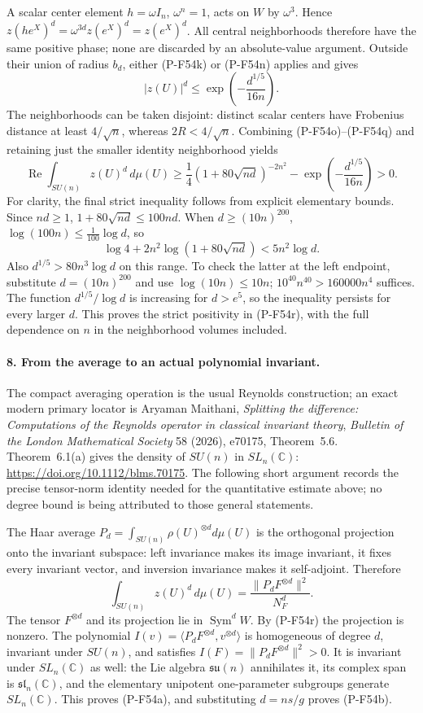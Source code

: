 A scalar center element $h=\omega I_n$, $\omega^n=1$,
acts on $W$ by $\omega^3$. Hence
$z(he^X)^d=\omega^{3d}z(e^X)^d=z(e^X)^d$.
All central neighborhoods therefore have the same positive
phase; none are discarded by an absolute-value argument.
Outside their union of radius $b_d$, either (P-F54k) or
(P-F54n) applies and gives
\[
       |z(U)|^d\le
           \exp\left(-\frac{d^{1/5}}{16n}\right).             \tag{P-F54q}
\]
The neighborhoods can be taken disjoint: distinct scalar
centers have Frobenius distance at least $4/\sqrt n$,
whereas $2R<4/\sqrt n$. Combining (P-F54o)--(P-F54q)
and retaining just the smaller identity neighborhood yields
\[
 \operatorname{Re}\int_{SU(n)}z(U)^d\,d\mu(U)
 \ge\frac14(1+80\sqrt{nd})^{-2n^2}
        -\exp\left(-\frac{d^{1/5}}{16n}\right)>0.             \tag{P-F54r}
\]
For clarity, the final strict inequality follows from explicit
elementary bounds. Since $nd\ge1$,
$1+80\sqrt{nd}\le100nd$.
When $d\ge(10n)^{200}$,
$\log(100n)\le\frac1{100}\log d$, so
\[
 \log4+2n^2\log(1+80\sqrt{nd})<5n^2\log d.
\]
Also $d^{1/5}>80n^3\log d$ on this range.
To check the latter at the left endpoint, substitute
$d=(10n)^{200}$ and use $\log(10n)\le10n$;
$10^{40}n^{40}>160000n^4$ suffices.
The function $d^{1/5}/\log d$ is increasing for $d>e^5$,
so the inequality persists for every larger $d$.
This proves the strict positivity in (P-F54r), with the
full dependence on $n$ in the neighborhood volumes included.

\paragraph{8. From the average to an actual polynomial invariant.}
The compact averaging operation is the usual Reynolds
construction; an exact modern primary locator is Aryaman
Maithani, \emph{Splitting the difference: Computations of the
Reynolds operator in classical invariant theory},
\emph{Bulletin of the London Mathematical Society} 58 (2026),
e70175, Theorem~5.6. Theorem~6.1(a) gives the density of
$SU(n)$ in $SL_n(\mathbb C)$:
\url{https://doi.org/10.1112/blms.70175}.
The following short argument records the precise tensor-norm
identity needed for the quantitative estimate above; no degree
bound is being attributed to those general statements.

The Haar average $P_d=\int_{SU(n)}\rho(U)^{\otimes d}d\mu(U)$
is the orthogonal projection onto the invariant subspace:
left invariance makes its image invariant, it fixes every
invariant vector, and inversion invariance makes it
self-adjoint. Therefore
\[
 \int_{SU(n)}z(U)^d\,d\mu(U)
             =\frac{\|P_dF^{\otimes d}\|^2}{N_F^d}.           \tag{P-F54s}
\]
The tensor $F^{\otimes d}$ and its projection lie in
$\operatorname{Sym}^dW$.
By (P-F54r) the projection is nonzero.
The polynomial
$I(v)=\langle P_dF^{\otimes d},v^{\otimes d}\rangle$
is homogeneous of degree $d$, invariant under $SU(n)$,
and satisfies $I(F)=\|P_dF^{\otimes d}\|^2>0$.
It is invariant under $SL_n(\mathbb C)$ as well:
the Lie algebra $\mathfrak{su}(n)$ annihilates it, its
complex span is $\mathfrak{sl}_n(\mathbb C)$, and the
elementary unipotent one-parameter subgroups generate
$SL_n(\mathbb C)$. This proves (P-F54a), and substituting
$d=ns/g$ proves (P-F54b).

